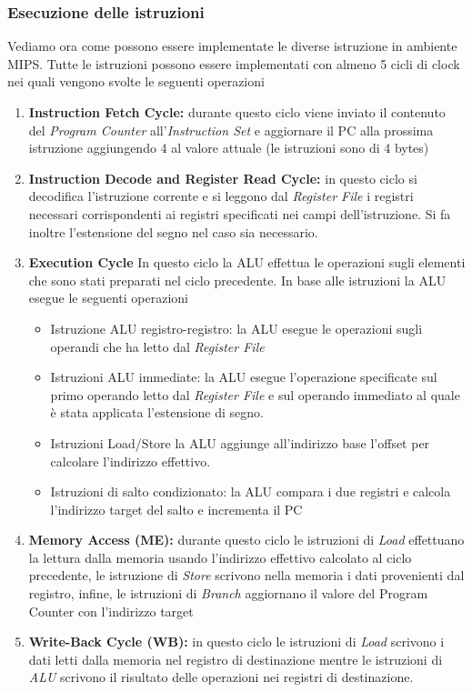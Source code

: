 \subsubsection{Esecuzione delle istruzioni}
Vediamo ora come possono essere implementate le diverse istruzione in ambiente MIPS. Tutte le istruzioni possono essere implementati con almeno 5 cicli di clock nei quali vengono svolte le seguenti operazioni
\begin{enumerate}
\item \textbf{Instruction Fetch Cycle:} durante questo ciclo viene inviato il contenuto del \emph{Program Counter} all'\emph{Instruction Set} e aggiornare il PC alla prossima istruzione aggiungendo 4 al valore attuale (le istruzioni sono di 4 bytes)
\item \textbf{Instruction Decode and Register Read Cycle:} in questo ciclo si decodifica l'istruzione corrente e si leggono dal \emph{Register File} i registri necessari corrispondenti ai registri specificati nei campi dell'istruzione. Si fa inoltre l'estensione del segno nel caso sia necessario.
\item \textbf{Execution Cycle} In questo ciclo la ALU effettua le operazioni sugli elementi che sono stati preparati nel ciclo precedente. In base alle istruzioni la ALU esegue le seguenti operazioni
\begin{itemize}
\item Istruzione ALU registro-registro: la ALU esegue le operazioni sugli operandi che ha letto dal \emph{Register File}
\item Istruzioni ALU immediate: la ALU esegue l'operazione specificate sul primo operando letto dal \emph{Register File} e sul operando immediato al quale è stata applicata l'estensione di segno.
\item Istruzioni Load/Store la ALU aggiunge all'indirizzo base l'offset per calcolare l'indirizzo effettivo.
\item Istruzioni di salto condizionato: la ALU compara i due registri e calcola l'indirizzo target del salto e incrementa il PC
\end{itemize}
\item \textbf{Memory Access (ME):} durante questo ciclo le istruzioni di \emph{Load} effettuano la lettura dalla memoria usando l'indirizzo effettivo calcolato al ciclo precedente, le istruzione di \emph{Store} scrivono nella memoria i dati provenienti dal registro, infine, le istruzioni di \emph{Branch}  aggiornano il valore del Program Counter con l'indirizzo target
\item \textbf{Write-Back Cycle (WB):} in questo ciclo le istruzioni di \emph{Load} scrivono i dati letti dalla memoria nel registro di destinazione mentre le istruzioni di \emph{ALU} scrivono il risultato delle operazioni nei registri di destinazione.
\end{enumerate}

